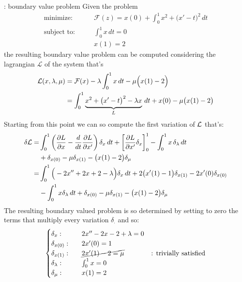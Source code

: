 \begin{example}{: boundary value problem}
	Given the problem	
	\begin{align*} 
		\textrm{minimize:}& \qquad \mathcal F(z) = x(0) + \int_0^1 x^2 + \big(x'-t\big)^2\, dt \\
		\textrm{subject to:}& \qquad \int_0^1 x\, dt = 0 \\ & \qquad x(1) = 2
	\end{align*}
	the resulting boundary value problem can be computed considering the lagrangian $\mathcal L$ of the system that's
	\begin{align*}
		\mathcal L(x,\lambda,\mu) & = \mathcal{F}(x) -\lambda \int_0^1 x\, dt - \mu\Big(x(1)-2\Big) \\
		& = \int_0^1 \underbrace{x^2 + \big(x'-t\big)^2 - \lambda x}_{L}\, dt + x(0) - \mu\big(x(1)-2\big)
	\end{align*}
	Starting from this point we can so compute the first variation of $\mathcal{L}$ that's:
	\begin{align*}
		\delta \mathcal{L} = & \int_0^1 \left( \frac{\partial  L}{\partial x} - \frac d {dt} \frac{\partial  L}{\partial x'} \right) \delta_x\, dt + \left[ \frac{\partial L}{\partial x'} \delta_x \right]_0^1  - \int_0^1 x\, \delta_\lambda \, dt \\ & + \delta_{x(0)} - \mu \delta_{x(1)} - \big( x(1) - 2 \big) \delta_\mu \\
		= & \int_0^1 \Big( -2x''  + 2x +2 -\lambda \Big) \delta_x\, dt + 2\big(x'(1) - 1\big)\delta_{x(1)} - 2 x'(0) \delta_{x(0)} \\ & - \int_0^1 x \delta_\lambda\, dt + \delta_{x(0)} - \mu  \delta_{x(1)} - \big(x(1)-2\big) \delta_\mu
	\end{align*}
	The resulting boundary valued problem is so determined by setting to zero the terms that multiply every variation $\delta_\cdot$ and so:
	\[ \begin{cases}
		\delta_x: \qquad & 2 x'' - 2x - 2 + \lambda = 0 \\
		\delta_{x(0)} : & 2x'(0) = 1 \\
		\delta_{x(1)} : & \cancel{2x'(1) - 2 = \mu} \qquad \qquad \textrm{: trivially satisfied} \\
		\delta_\lambda: & \int_0^1 x = 0 \\
		\delta_\mu: & x(1) = 2 \\

	\end{cases} \]
	
\end{example}

























